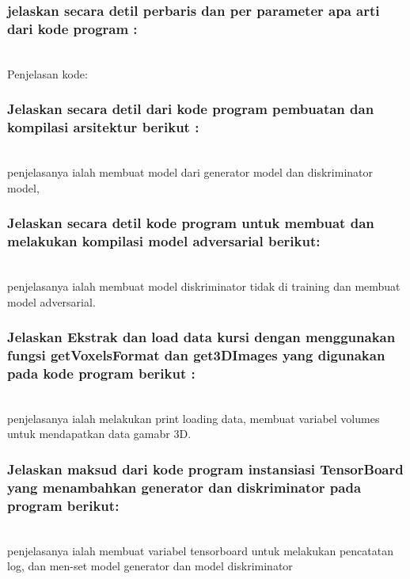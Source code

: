 \subsubsection{jelaskan secara detil perbaris dan per parameter apa arti dari kode program :}
\hfill\\
Penjelasan kode:



\subsubsection{Jelaskan secara detil dari kode program pembuatan dan kompilasi arsitektur berikut :}
\hfill\\

penjelasanya ialah membuat model dari generator model dan diskriminator model,


\subsubsection{Jelaskan secara detil kode program untuk membuat dan melakukan kompilasi model adversarial berikut:}
\hfill\\

penjelasanya ialah membuat model diskriminator tidak di training dan membuat model adversarial.


\subsubsection{Jelaskan Ekstrak dan load data kursi dengan menggunakan fungsi getVoxelsFormat dan get3DImages yang digunakan pada kode program berikut :}
\hfill\\

penjelasanya ialah melakukan print loading data, membuat variabel volumes untuk mendapatkan data gamabr 3D. 


\subsubsection{Jelaskan maksud dari kode program instansiasi TensorBoard yang menambahkan generator dan diskriminator pada program berikut:}
\hfill\\

penjelasanya ialah membuat variabel tensorboard untuk melakukan pencatatan log, dan men-set model generator dan model diskriminator


